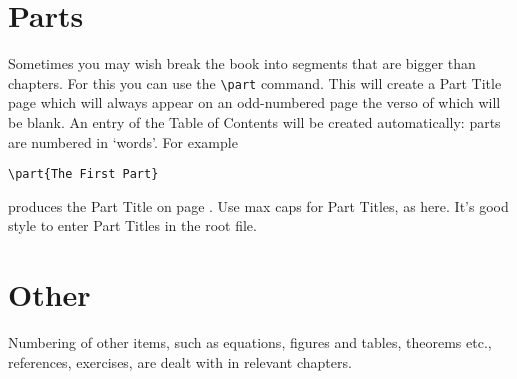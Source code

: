 \section{Parts}
Sometimes you may wish break the book into segments that are bigger than chapters. For this
you can use the \verb"\part" command. This will create a Part Title page which will always
appear on an odd-numbered page the verso of which will be blank. An entry of the Table of Contents
will be created automatically: parts are numbered in `words'. For example

\begin{verbatim}
\part{The First Part}
\end{verbatim}

\noindent
produces the Part Title on page \pageref{partpage}. Use max caps for Part Titles, as here.
It's good style to enter Part Titles in the root file. 

\section{Other}
Numbering of other items, such as equations, figures and tables, theorems etc., references, exercises, are
dealt with in relevant chapters.

\endinput